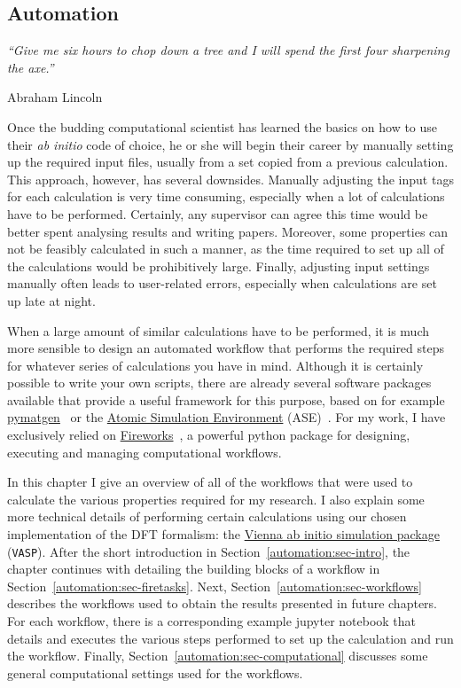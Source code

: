 \begin{refsection}

\chapter{Automation}

\setlength{\epigraphwidth}{3in}
\epigraph{\textit{``Give me six hours to chop down a tree and I will spend the first four sharpening the axe.''}}{Abraham Lincoln}
\vspace{3em}

Once the budding computational scientist has learned the basics on how to use their \textit{ab initio} code of choice, he or she will begin their career by manually setting up the required input files, usually from a set copied from a previous calculation. This approach, however, has several downsides. Manually adjusting the input tags for each calculation is very time consuming, especially when a lot of calculations have to be performed. Certainly, any supervisor can agree this time would be better spent analysing results and writing papers. Moreover, some properties can not be feasibly calculated in such a manner, as the time required to set up all of the calculations would be prohibitively large. Finally, adjusting input settings manually often leads to user-related errors, especially when calculations are set up late at night. 

When a large amount of similar calculations have to be performed, it is much more sensible to design an automated workflow that performs the required steps for whatever series of calculations you have in mind. Although it is certainly possible to write your own scripts, there are already several software packages available that provide a useful framework for this purpose, based on for example \href{http://pymatgen.org/}{pymatgen}~\cite{Ong2013} or the \href{https://wiki.fysik.dtu.dk/ase/}{Atomic Simulation Environment} (ASE)~\cite{Larsen2017}. For my work, I have exclusively relied on \href{https://materialsproject.github.io/fireworks/index.html}{Fireworks}~\cite{Jain2015}, a powerful python package for designing, executing and managing computational workflows.

In this chapter I give an overview of all of the workflows that were used to calculate the various properties required for my research. I also explain some more technical details of performing certain calculations using our chosen implementation of the DFT formalism: the \href{https://www.vasp.at/}{Vienna ab initio simulation package} (\texttt{VASP}). After the short introduction in Section~\ref{automation:sec-intro}, the chapter continues with detailing the building blocks of a workflow in Section~\ref{automation:sec-firetasks}. Next, Section~\ref{automation:sec-workflows} describes the workflows used to obtain the results presented in future chapters. For each workflow, there is a corresponding example jupyter notebook that details and executes the various steps performed to set up the calculation and run the workflow. Finally, Section~\ref{automation:sec-computational} discusses some general computational settings used for the workflows.


\end{refsection}
